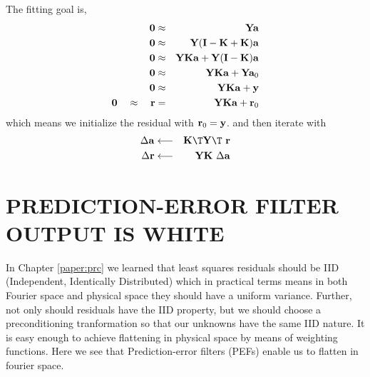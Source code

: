 The fitting goal is,
\begin{eqnarray}
\bold 0  &\approx & \bold Y                          \bold a            \\
\bold 0  &\approx & \bold Y(\bold I-\bold K+\bold K) \bold a            \\
\bold 0  &\approx & \bold Y\bold K\bold a +\bold Y(\bold I-\bold K)\bold a \\
\bold 0  &\approx & \bold Y\bold K\bold a +\bold Y \bold a_0 \\
\bold 0  &\approx & \bold Y\bold K\bold a +\bold y           \\
                                        \bold 0  \quad\approx\quad
\bold r  &=       & \bold Y\bold K\bold a +\bold r_0
\label{eqn:pefregression}
\end{eqnarray}
which means we initialize the residual with
$ \bold r_0 = \bold y$.
and then iterate with
\begin{eqnarray}
\Delta \bold a    &\longleftarrow& \bold K\T \bold Y\T\        \bold r \\
\Delta \bold r    &\longleftarrow& \bold Y  \bold K \ \Delta \bold a 
\end{eqnarray}



\section{PREDICTION-ERROR FILTER OUTPUT IS WHITE}
In Chapter \ref{paper:prc} we learned that least squares residuals
should be IID (Independent, Identically Distributed)
which in practical terms means in both Fourier space and physical
space they should have a uniform variance.
Further, not only should residuals have the IID property,
but we should choose a preconditioning tranformation
so that our unknowns have the same IID nature.
It is easy enough to achieve flattening in physical space
by means of weighting functions.
Here we see that Prediction-error filters (PEFs) enable
us to flatten in fourier space.
\par


